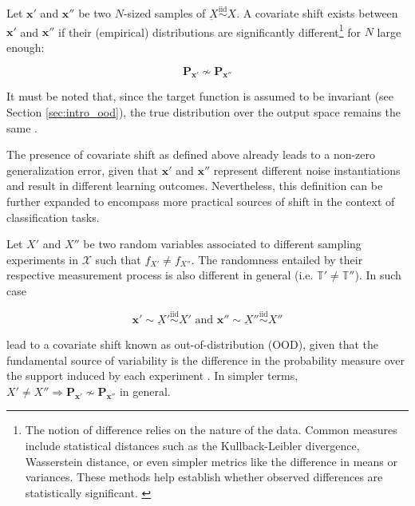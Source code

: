 \begin{definition}
    Let $\bm{x}'$ and $\bm{x}''$ be two $N$-sized samples of $\underbar{X} \overset{\text{iid}}{\sim} X$.
    A covariate shift exists between $\bm{x}'$ and $\bm{x}''$ if their
    (empirical) distributions are significantly different\footnote{
        The notion of difference relies on the nature of the data. Common measures 
        include statistical distances such as the Kullback-Leibler divergence, 
        Wasserstein distance, or even simpler metrics like the difference in 
        means or variances. These methods help establish whether observed 
        differences are statistically significant. \cite{quinonero-candelaDatasetShiftMachine2009}
    }
    for $N$ large enough:

    $$
    \mathbf{P}_{\bm{x}'} \not \sim \mathbf{P}_{\bm{x}''}
    $$
    
    It must be noted that, since the target function is assumed
    to be invariant (see Section \ref{sec:intro_ood}), 
    the true distribution over the output space
    remains the same \cite{quinonero-candelaDatasetShiftMachine2009}.
\end{definition}

The presence of covariate shift as defined above already leads
to a non-zero generalization error, given that $\bm{x}'$ and $\bm{x}''$ 
represent different noise instantiations and result in different 
learning outcomes. Nevertheless, this definition can be further
expanded to encompass more practical sources of shift in the 
context of classification tasks.

\begin{definition}\label{def:domain_shift}
    Let $X'$ and $X''$ be two random variables associated to different sampling 
    experiments in $\mathcal{X}$ such that $f_{X'} \neq f_{X''}$.
    The randomness entailed by their respective measurement process is also different
    in general (i.e. $\mathbb{T}' \neq \mathbb{T}''$). In such case

    $$
        \bm{x}' \sim \underbar{X}' \overset{\text{iid}}{\sim} X' \text{ and } \bm{x}'' \sim \underbar{X}'' \overset{\text{iid}}{\sim} X''
    $$

    lead to a covariate shift known as out-of-distribution (OOD), given that 
    the fundamental source of variability is the difference in the probability
    measure over the support induced by each experiment
    \cite{quinonero-candelaDatasetShiftMachine2009}.
    In simpler terms, $X' \neq X'' \Longrightarrow \mathbf{P}_{\bm{x}'} \not \sim \mathbf{P}_{\bm{x}''}$ in general.
\end{definition}

